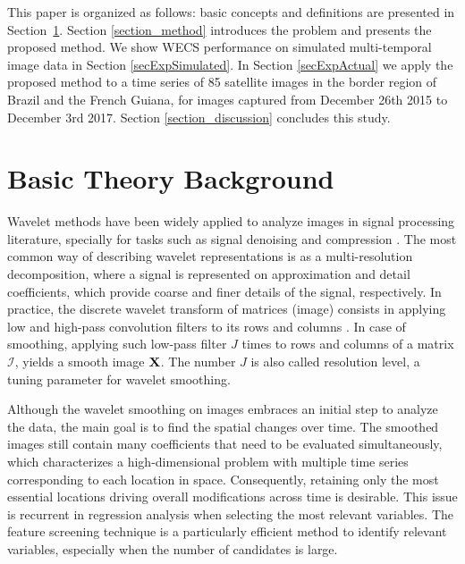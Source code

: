 \documentclass[journal]{IEEEtran}
\newcommand{\vX}{{\textbf X}}
\begin{document}
This paper is organized as follows: basic concepts and definitions are presented in Section~\ref{section_theroy}.
Section \ref{section_method} introduces the problem and presents the proposed method. We show WECS performance on simulated multi-temporal image data in Section \ref{secExpSimulated}. In Section \ref{secExpActual} we apply the proposed method to a time series of 85 satellite images in the border region of Brazil and the French Guiana, for  images captured from December 26th 2015 to December 3rd 2017.  Section \ref{section_discussion} concludes this study.%


\section{Basic Theory Background}\label{section_theroy}

Wavelet methods have been widely applied to analyze images in signal processing literature, specially for tasks such as signal denoising and compression \cite{mallat1998wavelet}. The most common way of describing wavelet representations is as a multi-resolution decomposition, where a signal is represented on approximation and detail coefficients, which provide coarse and finer details of the signal, respectively. In practice, the discrete wavelet transform of matrices (image) consists in applying low and high-pass convolution filters to its rows and columns \cite{mallat1989theory}. In case of smoothing, applying such low-pass filter $J$ times to rows and columns of a matrix $\mathcal{I}$, yields a smooth image $\vX$. The number $J$ is also called resolution level, a tuning parameter for wavelet smoothing. 


Although the wavelet smoothing on images embraces an initial step to analyze the data, the main goal is to find the spatial changes over time. 
The smoothed images still contain many coefficients that need to be evaluated simultaneously, which characterizes a high-dimensional problem with multiple time series corresponding to each location in space. 
Consequently, retaining only the most essential locations driving overall modifications across time is desirable. 
This issue is recurrent in regression analysis when selecting the most relevant variables.
The feature screening technique is a particularly efficient method to identify relevant variables, especially when the number of candidates is large.
\end{document}
